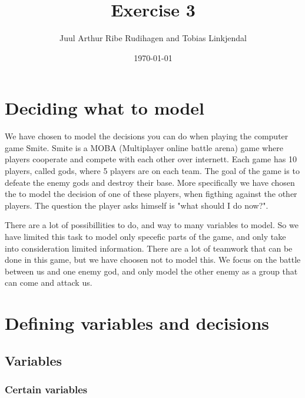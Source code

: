 \documentclass[titlepage]{article}
\author{Juul Arthur Ribe Rudihagen and Tobias Linkjendal}
\title{Exercise 3}
\date{\today}
\begin{document}
\maketitle


\tableofcontents

\newpage


\section{Deciding what to model}
We have chosen to model the decisions you can do when playing the computer game Smite. Smite is a MOBA (Multiplayer online battle arena) game where players cooperate and compete with each other over internett. Each game has 10 players, called gods, where 5 players are on each team. The goal of the game is to defeate the enemy gods and destroy their base. More specifically we have chosen the to model the decision of one of these players, when figthing against the other players. The question the player asks himself is "what should I do now?".

There are a lot of possibillities to do, and way to many variables to model. So we have limited this task to model only specefic parts of the game, and only take into consideration limited information. There are a lot of teamwork that can be done in this game, but we have choosen not to model this. We focus on the battle between us and one enemy god, and only model the other enemy as a group that can come and attack us.


\section{Defining variables and decisions}

\subsection{Variables}
\subsubsection{Certain variables}
\end{document}
